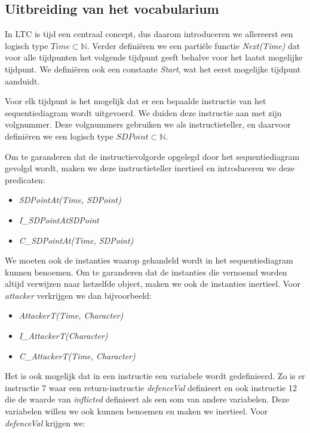 \subsection{Uitbreiding van het vocabularium}
In LTC is tijd een centraal concept, dus daarom introduceren we allereerst een logisch type $Time \subset \mathbb{N}$. Verder defini\"eren we een parti\"ele functie \textit{Next(Time)} dat voor alle tijdpunten het volgende tijdpunt geeft behalve voor het laatst mogelijke tijdpunt. We defini\"eren ook een constante \textit{Start}, wat het eerst mogelijke tijdpunt aanduidt.

Voor elk tijdpunt is het mogelijk dat er een bepaalde instructie van het sequentiediagram wordt uitgevoerd. We duiden deze instructie aan met zijn volgnummer.
Deze volgnummers gebruiken we als instructieteller, en daarvoor defini\"eren we een logisch type $SDPoint \subset \mathbb{N}$.

Om te garanderen dat de instructievolgorde opgelegd door het sequentiediagram gevolgd wordt, maken we deze instructieteller inertieel en introduceren we deze predicaten:

\begin{itemize}
	\item \textit{SDPointAt(Time, SDPoint)}
	\item \textit{I\_SDPointAt{SDPoint}}
	\item \textit{C\_SDPointAt(Time, SDPoint)}
\end{itemize}

We moeten ook de instanties waarop gehandeld wordt in het sequentiediagram kunnen benoemen. Om te garanderen dat de instanties die vernoemd worden altijd verwijzen naar hetzelfde object, maken we ook de instanties inertieel. Voor \textit{attacker} verkrijgen we dan bijvoorbeeld:

\begin{itemize}
	\item \textit{AttackerT(Time, Character)}
	\item \textit{I\_AttackerT(Character)}
	\item \textit{C\_AttackerT(Time, Character)}
\end{itemize}

Het is ook mogelijk dat in een instructie een variabele wordt gedefinieerd. Zo is er instructie 7 waar een return-instructie \textit{defenceVal} definieert en ook instructie 12 die de waarde van \textit{inflicted} definieert als een som van andere variabelen. Deze variabelen willen we ook kunnen benoemen en maken we inertieel. Voor \textit{defenceVal} krijgen we:

